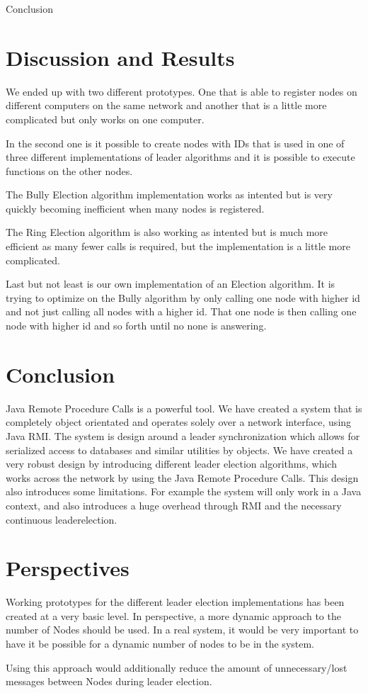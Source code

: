 {Conclusion}
\section{Discussion and Results}
We ended up with two different prototypes. One that is able to register nodes on different computers on the same network and another that is a little more complicated but only works on one computer.

In the second one is it possible to create nodes with IDs that is used in one of three different implementations of leader algorithms and it is possible to execute functions on the other nodes.

The Bully Election algorithm implementation works as intented but is very quickly becoming inefficient when many nodes is registered.

The Ring Election algorithm is also working as intented but is much more efficient as many fewer calls is required, but the implementation is a little more complicated.

Last but not least is our own implementation of an Election algorithm. It is trying to optimize on the Bully algorithm by only calling one node with higher id and not just calling all nodes with a higher id. That one node is then calling one node with higher id and so forth until no none is answering.

\section{Conclusion}
Java Remote Procedure Calls is a powerful tool. We have created a system that is completely object orientated and operates solely over a network interface, using Java RMI. The system is design around a leader synchronization which allows for serialized access to databases and similar utilities by objects. We have created a very robust design by introducing different leader election algorithms, which works across the network by using the Java Remote Procedure Calls.
This design also introduces some limitations. For example the system will only work in a Java context, and also introduces a huge overhead through RMI and the necessary continuous leaderelection.


\section{Perspectives}
Working prototypes for the different leader election implementations has been created at a very basic level. In perspective, a more dynamic approach to the number of Nodes should be used. In a real system, it would be very important to have it be possible for a dynamic number of nodes to be in the system. 

Using this approach would additionally reduce the amount of unnecessary/lost messages between Nodes during leader election. 

